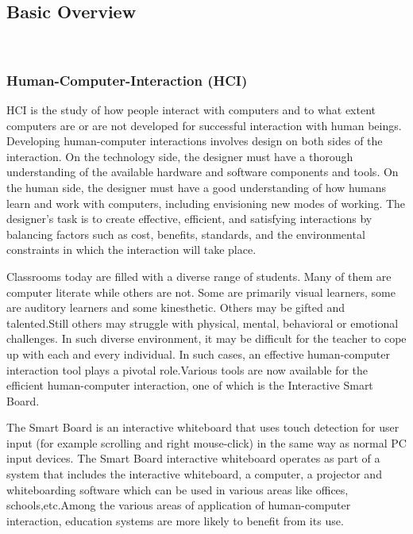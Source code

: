 \documentclass[12pt, a4paper]{article}
\begin{document}
\subsection{Basic Overview}
~\\
\subsubsection{Human-Computer-Interaction (HCI)} 
HCI is the study of how people interact with computers and to what extent computers are or are not developed for successful interaction with human beings. Developing human-computer interactions involves design on both sides of the interaction. On the technology side, the designer must have a thorough understanding of the available hardware and software components and tools. On the human side, the designer must have a good understanding of how humans learn and work with computers, including envisioning new modes of working. The designer's task is to create effective, efficient, and satisfying interactions by balancing factors such as cost, benefits, standards, and the environmental constraints in which the interaction will take place. 

Classrooms today are filled with a diverse range of students. Many of them are computer literate while others are not. Some are primarily visual learners, some are auditory learners and some kinesthetic. Others may be gifted and talented.Still others may struggle with physical, mental, behavioral or emotional challenges. In such diverse environment, it may be difficult for the teacher to cope up with each and every individual. In such cases, an effective human-computer interaction tool plays a pivotal role.Various tools are now available for the efficient human-computer interaction, one of which is the Interactive Smart Board.

The Smart Board is an interactive whiteboard that uses touch detection for user input (for example scrolling and right mouse-click) in the same way as normal PC input devices. The Smart Board interactive whiteboard operates as part of a system that includes the interactive whiteboard, a computer, a projector and whiteboarding software which can be used in various areas like offices, schools,etc.Among the various areas of application of human-computer interaction, education systems are more likely to benefit from its use.
\end{document}
